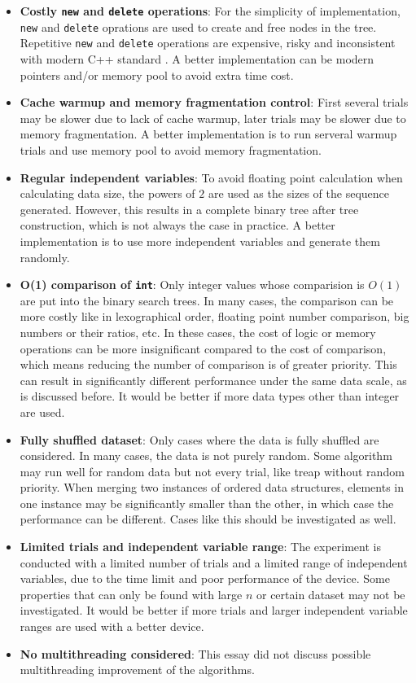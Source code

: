 \documentclass[12pt]{article}
\begin{document}
\begin{itemize}
    \item \textbf{Costly \texttt{new} and \texttt{delete} operations}: For the simplicity of implementation, \texttt{new} and \texttt{delete} oprations are used to create and free nodes in the tree. Repetitive \texttt{new} and \texttt{delete} operations are expensive, risky and inconsistent with modern C++ standard \cite{meyers-2014}. A better implementation can be modern pointers and/or memory pool to avoid extra time cost.
    \item \textbf{Cache warmup and memory fragmentation control}: First several trials may be slower due to lack of cache warmup, later trials may be slower due to memory fragmentation. A better implementation is to run serveral warmup trials and use memory pool to avoid memory fragmentation.
    \item \textbf{Regular independent variables}: To avoid floating point calculation when calculating data size, the powers of $2$ are used as the sizes of the sequence generated. However, this results in a complete binary tree after tree construction, which is not always the case in practice. A better implementation is to use more independent variables and generate them randomly.
    \item \textbf{O(1) comparison of \texttt{int}}: Only integer values whose comparision is $O(1)$ are put into the binary search trees. In many cases, the comparison can be more costly like in lexographical order, floating point number comparison, big numbers or their ratios, etc. In these cases, the cost of logic or memory operations can be more insignificant compared to the cost of comparison, which means reducing the number of comparison is of greater priority. This can result in significantly different performance under the same data scale, as is discussed before. It would be better if more data types other than integer are used.
    \item \textbf{Fully shuffled dataset}: Only cases where the data is fully shuffled are considered. In many cases, the data is not purely random. Some algorithm may run well for random data but not every trial, like treap without random priority. When merging two instances of ordered data structures, elements in one instance may be significantly smaller than the other, in which case the performance can be different. Cases like this should be investigated as well. 
    \item \textbf{Limited trials and independent variable range}: The experiment is conducted with a limited number of trials and a limited range of independent variables, due to the time limit and poor performance of the device. Some properties that can only be found with large $n$ or certain dataset may not be investigated. It would be better if more trials and larger independent variable ranges are used with a better device.
    \item \textbf{No multithreading considered}: This essay did not discuss possible multithreading improvement of the algorithms. %
\end{itemize}
\end{document}
